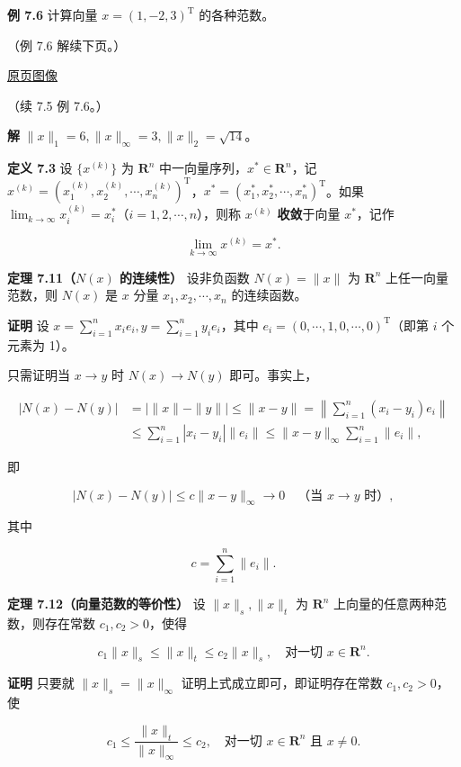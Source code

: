 \documentclass[
  10pt,
  fontset=fandol]{ctexart}
\begin{document}
\textbf{例 7.6} 计算向量 \(x=(1,-2,3)^{\mathrm T}\) 的各种范数。

（例 7.6 解续下页。）

\href{../../source-images/pdf-201.jpeg}{原页图像}

（续 7.5 例 7.6。）

\textbf{解} \(\|x\|_1=6,\|x\|_\infty=3,\|x\|_2=\sqrt{14}\)。

\textbf{定义 7.3} 设 \(\{x^{(k)}\}\) 为 \(\mathbf R^n\) 中一向量序列，\(x^*\in\mathbf R^n\)，记 \(x^{(k)}=(x_1^{(k)},x_2^{(k)},\cdots,x_n^{(k)})^{\mathrm T}\)，\(x^*=(x_1^*,x_2^*,\cdots,x_n^*)^{\mathrm T}\)。如果 \(\lim_{k\to\infty}x_i^{(k)}=x_i^*\)（\(i=1,2,\cdots,n\)），则称 \(x^{(k)}\) \textbf{收敛}于向量 \(x^*\)，记作

\[
\lim_{k\to\infty}x^{(k)}=x^*.
\]

\textbf{定理 7.11（\(N(x)\) 的连续性）} 设非负函数 \(N(x)=\|x\|\) 为 \(\mathbf R^n\) 上任一向量范数，则 \(N(x)\) 是 \(x\) 分量 \(x_1,x_2,\cdots,x_n\) 的连续函数。

\textbf{证明} 设 \(x=\sum_{i=1}^{n}x_ie_i,y=\sum_{i=1}^{n}y_ie_i\)，其中 \(e_i=(0,\allowbreak \cdots,\allowbreak 1,\allowbreak 0,\allowbreak \cdots,\allowbreak 0)^{\mathrm T}\)（即第 \(i\) 个元素为 1）。

只需证明当 \(x\to y\) 时 \(N(x)\to N(y)\) 即可。事实上，

\[
\begin{aligned}
|N(x)-N(y)|
&=\big|\|x\|-\|y\|\big|\leqslant\|x-y\|
=\left\|\sum_{i=1}^{n}(x_i-y_i)e_i\right\|\\
&\leqslant\sum_{i=1}^{n}|x_i-y_i|\|e_i\|
\leqslant\|x-y\|_\infty\sum_{i=1}^{n}\|e_i\|,
\end{aligned}
\]

即

\[
|N(x)-N(y)|\leqslant c\|x-y\|_\infty\to0\quad\text{（当 }x\to y\text{ 时）},
\]

其中

\[
c=\sum_{i=1}^{n}\|e_i\|.
\]

\textbf{定理 7.12（向量范数的等价性）} 设 \(\|x\|_s,\|x\|_t\) 为 \(\mathbf R^n\) 上向量的任意两种范数，则存在常数 \(c_1,c_2>0\)，使得

\[
c_1\|x\|_s\leqslant\|x\|_t\leqslant c_2\|x\|_s,\quad\text{对一切 }x\in\mathbf R^n.
\]

\textbf{证明} 只要就 \(\|x\|_s=\|x\|_\infty\) 证明上式成立即可，即证明存在常数 \(c_1,c_2>0\)，使

\[
c_1\leqslant\frac{\|x\|_t}{\|x\|_\infty}\leqslant c_2,\quad\text{对一切 }x\in\mathbf R^n\text{ 且 }x\neq0.
\]
\end{document}

